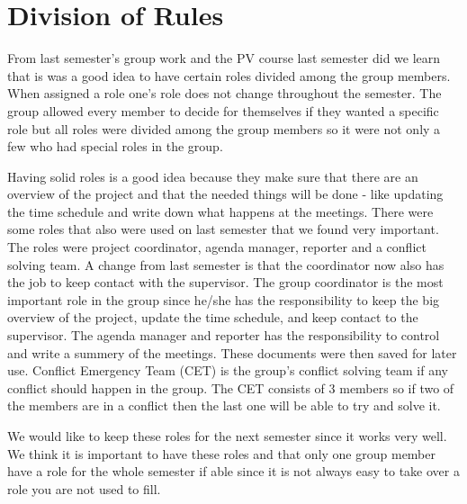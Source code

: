 \section{Division of Rules}
From last semester's group work and the PV course last semester did we learn that is was a good idea to have certain roles divided among the group members. When assigned a role one's role does not change throughout the semester. The group allowed every member to decide for themselves if they wanted a specific role but all roles were divided among the group members so it were not only a few who had special roles in the group.

Having solid roles is a good idea because they make sure that there are an overview of the project and that the needed things will be done - like updating the time schedule and write down what happens at the meetings.
There were some roles that also were used on last semester that we found very important. The roles were project coordinator, agenda manager, reporter and a conflict solving team. A change from last semester is that the coordinator now also has the job to keep contact with the supervisor.
The group coordinator is the most important role in the group since he/she has the responsibility to keep the big overview of the project, update the time schedule, and keep contact to the supervisor. 
The agenda manager and reporter has the responsibility to control and write a summery of the meetings. These documents were then saved for later use. Conflict Emergency Team (CET) is the group's conflict solving team if any conflict should happen in the group. The CET consists of 3 members so if two of the members are in a conflict then the last one will be able to try and solve it.

We would like to keep these roles for the next semester since it works very well. We think it is important to have these roles and that only one group member have a role for the whole semester if able since it is not always easy to take over a role you are not used to fill.
